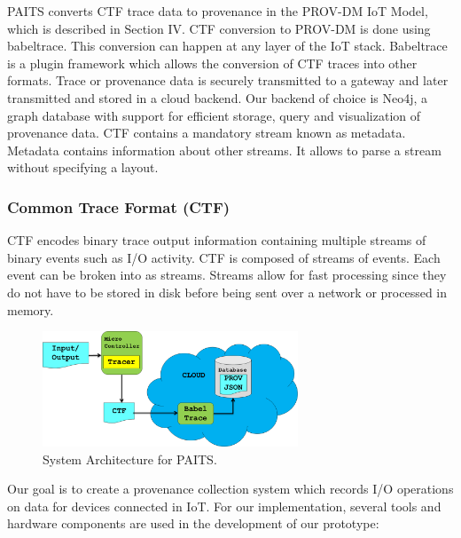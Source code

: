 \documentclass[conference]{IEEEtran}
\begin{document}

PAITS converts CTF trace data to provenance in the PROV-DM IoT Model, which is described in Section IV. CTF conversion to PROV-DM is done using babeltrace. This conversion can happen at any layer of the IoT stack. Babeltrace is a plugin framework which allows the conversion of CTF traces into other formats. Trace or provenance data is securely transmitted to a gateway and later transmitted and stored in a cloud backend. Our backend of choice is Neo4j, a graph database with support for efficient storage, query and visualization of provenance data. CTF contains a mandatory stream known as metadata. Metadata contains information about other streams. It allows to parse a stream without specifying a layout.



\subsubsection{Common Trace Format (CTF) }
CTF encodes binary trace output information containing multiple streams of binary events such as I/O activity.  CTF is composed of streams of events. Each event can be broken into as streams. Streams allow for fast processing since they do not have to be stored in disk before  being sent over a network or processed in memory.





\begin{figure}[h!]
\begin{center}

\includegraphics[width =3.0in]{system_architecture.PNG}    
\end{center}
\caption{System Architecture for PAITS.}
\label{architecture}
\end{figure}

Our goal is to create a provenance collection system which records I/O operations on data for devices connected in IoT. For our implementation, several tools and hardware components are used in the development of our prototype:
\end{document}
